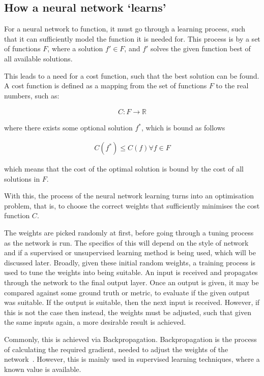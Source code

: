 \subsection{How a neural network `learns'}

For a neural network to function, it must go through a learning process, such
that it can sufficiently model the function it is needed for. This process
is by a set of functions $F$, where a solution $f' \in F$, and $f'$ solves
the given function best of all available solutions.

This leads to a need for a cost function, such that the best solution can be found.
A cost function is defined as a mapping from the set of functions $F$ to the real
numbers, such as:

\begin{align}
    C : F \rightarrow \mathbb{R}
\end{align}

where there exists some optional solution $f^*$, which is bound as follows

\begin{align}
    C(f^*) \le C(f) \forall f \in F
\end{align}

which means that the cost of the optimal solution is bound by the cost of
all solutions in $F$.

With this, the process of the neural network learning turns into an
optimisation problem, that is, to choose the correct weights that sufficiently
minimises the cost function $C$.

The weights are picked randomly at first, before going through a tuning
process as the network is run. The specifics of this will depend on
the style of network and if a supervised or unsupervised learning method
is being used, which will be discussed later. Broadly, given these
initial random weights, a training process is used to tune the weights
into being suitable. An input is received and propagates through the
network to the final output layer. Once an output is given, it may be compared
against some ground truth or metric, to evaluate if the given output was suitable.
If the output is suitable, then the next input is received. However, if this
is not the case then instead, the weights must be adjusted, such that
given the same inputs again, a more desirable result is achieved.

Commonly, this is achieved via Backpropagation. Backpropagation is the process
of calculating the required gradient, needed to adjust the weights of the
network~\cite{goodfellow2016deep}. However, this is mainly used
in supervised learning techniques, where a known value is available.

